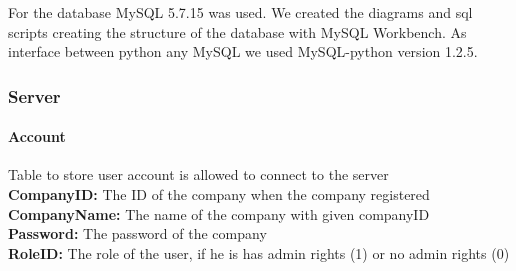 \documentclass[a4paper, 11pt]{article}
\begin{document}
For the database MySQL 5.7.15 was used. We created the diagrams and sql scripts creating the structure of the database with MySQL Workbench.
As interface between python any MySQL we used MySQL-python version 1.2.5.
\subsubsection*{Server}

\noindent
{}

\paragraph*{Account}
Table to store user account is allowed to connect to the server
 \\
\textbf{CompanyID:} The ID of the company when the company registered
 \\
\textbf{CompanyName:} The name of the company with given companyID
 \\
\textbf{Password:} The password of the company
 \\
\textbf{RoleID:} The role of the user, if he is has admin rights (1) or no admin rights (0)
 
\end{document}

